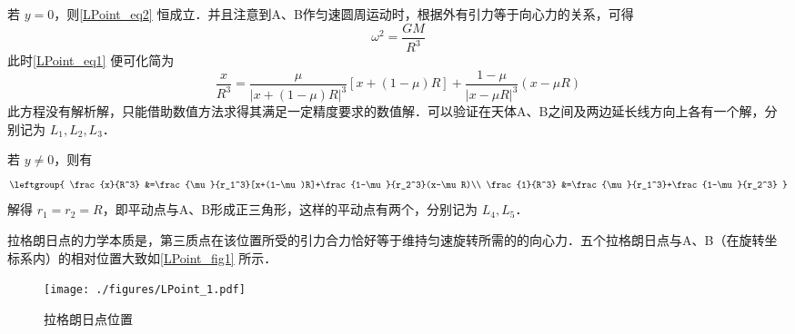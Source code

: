 若 $y=0$，则\autoref{LPoint_eq2} 恒成立．并且注意到A、B作匀速圆周运动时，根据外有引力等于向心力的关系，可得
\begin{equation}%
\omega^2 =\frac{GM}{R^3}
\end{equation}
此时\autoref{LPoint_eq1} 便可化简为
\begin{equation}%
\frac{x}{R^3} =\frac{\mu}{|x+(1-\mu)R|^3}[x+(1-\mu)R]+\frac{1-\mu}{|x-\mu R|^3}(x-\mu R)
\end{equation}
此方程没有解析解，只能借助数值方法求得其满足一定精度要求的数值解．可以验证在天体A、B之间及两边延长线方向上各有一个解，分别记为 $L_1,L_2,L_3$．

若 $y\neq 0$，则有
\begin{equation}%
\leftgroup{
\frac{x}{R^3} &=\frac{\mu}{r_1^3}[x+(1-\mu)R]+\frac{1-\mu}{r_2^3}(x-\mu R)\\
\frac{1}{R^3} &=\frac{\mu}{r_1^3}+\frac{1-\mu}{r_2^3}
}
\end{equation}
解得 $r_1=r_2=R$，即平动点与A、B形成正三角形，这样的平动点有两个，分别记为 $L_4,L_5$．

拉格朗日点的力学本质是，第三质点在该位置所受的引力合力恰好等于维持匀速旋转所需的的向心力．五个拉格朗日点与A、B（在旋转坐标系内）的相对位置大致如\autoref{LPoint_fig1} 所示．
\begin{figure}[ht]
\centering
\texttt{[image: ./figures/LPoint\_1.pdf]}
\caption{拉格朗日点位置} \label{LPoint_fig1}
\end{figure}
